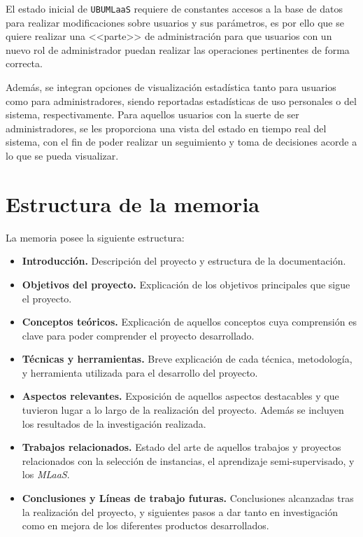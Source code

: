 El estado inicial de \texttt{UBUMLaaS} requiere de constantes accesos a la base de datos para realizar modificaciones sobre usuarios y sus parámetros, es por ello que se quiere realizar una <<parte>> de administración para que usuarios con un nuevo rol de administrador puedan realizar las operaciones pertinentes de forma correcta.

Además, se integran opciones de visualización estadística tanto para usuarios como para administradores, siendo reportadas estadísticas de uso personales o del sistema, respectivamente. Para aquellos usuarios con la suerte de ser administradores, se les proporciona una vista del estado en tiempo real del sistema, con el fin de poder realizar un seguimiento y toma de decisiones acorde a lo que se pueda visualizar.

\section{Estructura de la memoria}\label{estructura-de-la-memoria}
La memoria posee la siguiente estructura:
\begin{itemize}
\item \textbf{Introducción.} Descripción del proyecto y estructura de la documentación.
\item \textbf{Objetivos del proyecto.} Explicación de los objetivos principales que sigue el proyecto.
\item \textbf{Conceptos teóricos.} Explicación de aquellos conceptos cuya comprensión es clave para poder comprender el proyecto desarrollado.
\item \textbf{Técnicas y herramientas.} Breve explicación de cada técnica, metodología, y herramienta utilizada para el desarrollo del proyecto.
\item \textbf{Aspectos relevantes.} Exposición de aquellos aspectos destacables y que tuvieron lugar a lo largo de la realización del proyecto. Además se incluyen los resultados de la investigación realizada.
\item \textbf{Trabajos relacionados.} Estado del arte de aquellos trabajos y proyectos relacionados con la selección de instancias, el aprendizaje semi-supervisado, y los \textit{MLaaS}.
\item \textbf{Conclusiones y Líneas de trabajo futuras.} Conclusiones alcanzadas tras la realización del proyecto, y siguientes pasos a dar tanto en investigación como en mejora de los diferentes productos desarrollados.
\end{itemize}

